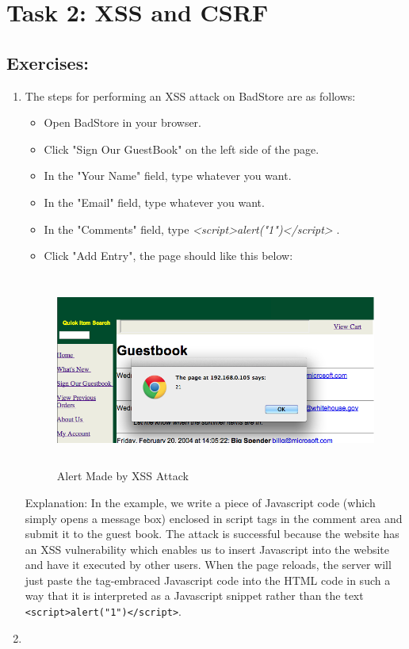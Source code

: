 \section*{Task 2: XSS and CSRF}
\subsection*{Exercises:}
\begin{enumerate}
\item {}

The steps for performing an XSS attack on BadStore are as follows:
  \begin{itemize}
  \item Open BadStore in your browser.
  \item Click "Sign Our GuestBook" on the left side of the page.
  \item In the "Your Name" field, type whatever you want.
  \item In the "Email" field, type whatever you want.
  \item In the "Comments" field, type \textit{<script>alert("1")</script>} .
  \item Click "Add Entry", the page should like this below:
  \end{itemize}
  \begin{figure}[h!]
    \caption{Alert Made by XSS Attack}
    \begin{center}\includegraphics[height=2.5in]{xss}
    \end{center}
  \end{figure}

  Explanation: In the example, we write a piece of Javascript code (which simply opens a message box) enclosed in script tags in the comment area and submit it to the guest book. The attack is successful because the website has an XSS vulnerability which enables us to insert Javascript into the website and have it executed by other users. When the page reloads, the server will just paste the tag-embraced Javascript code into the HTML code in such a way that it is interpreted as a Javascript snippet rather than the text \verb|<script>alert("1")</script>|.
\item {}


\end{enumerate}

